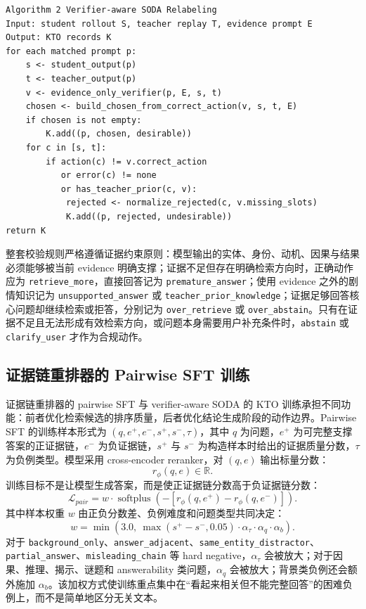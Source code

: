 \documentclass[UTF8,a4paper,12pt]{ctexart}
\newcommand{\code}[1]{\texttt{#1}}
\begin{document}
\begin{verbatim}
Algorithm 2 Verifier-aware SODA Relabeling
Input: student rollout S, teacher replay T, evidence prompt E
Output: KTO records K
for each matched prompt p:
    s <- student_output(p)
    t <- teacher_output(p)
    v <- evidence_only_verifier(p, E, s, t)
    chosen <- build_chosen_from_correct_action(v, s, t, E)
    if chosen is not empty:
        K.add((p, chosen, desirable))
    for c in [s, t]:
        if action(c) != v.correct_action
           or error(c) != none
           or has_teacher_prior(c, v):
            rejected <- normalize_rejected(c, v.missing_slots)
            K.add((p, rejected, undesirable))
return K
\end{verbatim}

整套校验规则严格遵循证据约束原则：模型输出的实体、身份、动机、因果与结果必须能够被当前 evidence 明确支撑；证据不足但存在明确检索方向时，正确动作应为 \code{retrieve\_more}，直接回答记为 \code{premature\_answer}；使用 evidence 之外的剧情知识记为 \code{unsupported\_answer} 或 \code{teacher\_prior\_knowledge}；证据足够回答核心问题却继续检索或拒答，分别记为 \code{over\_retrieve} 或 \code{over\_abstain}。只有在证据不足且无法形成有效检索方向，或问题本身需要用户补充条件时，\code{abstain} 或 \code{clarify\_user} 才作为合规动作。

\subsection{证据链重排器的 Pairwise SFT 训练}

证据链重排器的 pairwise SFT 与 verifier-aware SODA 的 KTO 训练承担不同功能：前者优化检索候选的排序质量，后者优化结论生成阶段的动作边界。Pairwise SFT 的训练样本形式为 $(q,e^+,e^-,s^+,s^-,\tau)$，其中 $q$ 为问题，$e^+$ 为可完整支撑答案的正证据链，$e^-$ 为负证据链，$s^+$ 与 $s^-$ 为构造样本时给出的证据质量分数，$\tau$ 为负例类型。模型采用 cross-encoder reranker，对 $(q,e)$ 输出标量分数：
\[
r_\phi(q,e)\in\mathbb{R}.
\]
训练目标不是让模型生成答案，而是使正证据链分数高于负证据链分数：
\[
\mathcal{L}_{pair}
=w\cdot \operatorname{softplus}\left(-\left[r_\phi(q,e^+)-r_\phi(q,e^-)\right]\right).
\]
其中样本权重 $w$ 由正负分数差、负例难度和问题类型共同决定：
\[
w=\min\left(3.0,\ \max(s^+-s^-,0.05)\cdot \alpha_\tau \cdot \alpha_q \cdot \alpha_b\right).
\]
对于 \code{background\_only}、\code{answer\_adjacent}、\code{same\_entity\_distractor}、\code{partial\_answer}、\code{misleading\_chain} 等 hard negative，$\alpha_\tau$ 会被放大；对于因果、推理、揭示、谜题和 answerability 类问题，$\alpha_q$ 会被放大；背景类负例还会额外施加 $\alpha_b$。该加权方式使训练重点集中在“看起来相关但不能完整回答”的困难负例上，而不是简单地区分无关文本。
\end{document}
